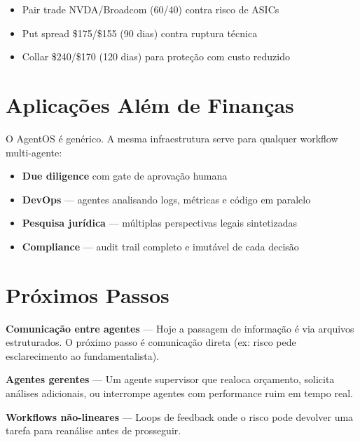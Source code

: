 \documentclass[11pt,a4paper]{article}
\begin{document}
\begin{itemize}[nosep]
  \item Pair trade NVDA/Broadcom (60/40) contra risco de ASICs
  \item Put spread \$175/\$155 (90 dias) contra ruptura t\'ecnica
  \item Collar \$240/\$170 (120 dias) para prote\c{c}\~ao com custo reduzido
\end{itemize}

\newpage


\section{Aplica\c{c}\~oes Al\'em de Finan\c{c}as}

O AgentOS \'e gen\'erico. A mesma infraestrutura serve para qualquer workflow multi-agente:

\begin{itemize}
  \item \textbf{Due diligence} com gate de aprova\c{c}\~ao humana
  \item \textbf{DevOps} --- agentes analisando logs, m\'etricas e c\'odigo em paralelo
  \item \textbf{Pesquisa jur\'idica} --- m\'ultiplas perspectivas legais sintetizadas
  \item \textbf{Compliance} --- audit trail completo e imut\'avel de cada decis\~ao
\end{itemize}


\section{Pr\'oximos Passos}

\textbf{Comunica\c{c}\~ao entre agentes} --- Hoje a passagem de informa\c{c}\~ao \'e via arquivos estruturados. O pr\'oximo passo \'e comunica\c{c}\~ao direta (ex: risco pede esclarecimento ao fundamentalista).

\textbf{Agentes gerentes} --- Um agente supervisor que realoca or\c{c}amento, solicita an\'alises adicionais, ou interrompe agentes com performance ruim em tempo real.

\textbf{Workflows n\~ao-lineares} --- Loops de feedback onde o risco pode devolver uma tarefa para rean\'alise antes de prosseguir.
\end{document}
